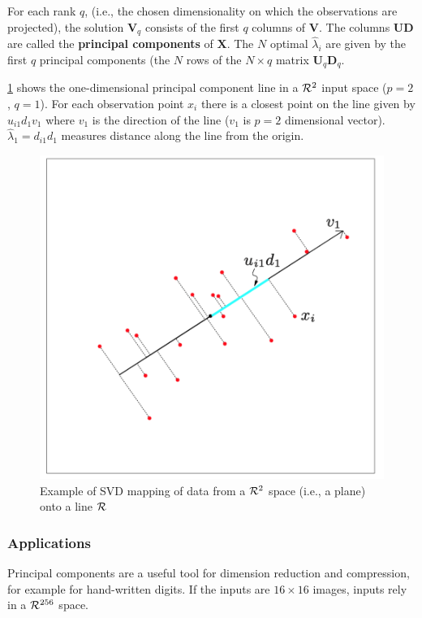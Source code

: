 \documentclass[12pt, letterpaper]{article}
\theoremstyle{definition}
\newcommand{\X}{\mathrm{\mathbf{X}}}
\begin{document}
For each rank $q$, (i.e., the chosen dimensionality on which the observations are projected), the solution $\mathbf{V}_q$  consists of the first $q$ columns of $\mathbf{V}$. The columns $\mathbf{UD}$ are called the \textbf{principal components} of $\X$. The $N$ optimal $\hat{\lambda}_i$ are given by the first $q$ principal components (the $N$ rows of the $N \times q$ matrix $\mathbf{U}_q\mathbf{D}_q$.

\ref{SVDex} shows the one-dimensional principal component line in a $\CMcal{R}^2$ input space ($p=2$, $q=1$). For each observation point $x_i$ there is a closest point on the line given by $u_{i1}d_1v_1$ where $v_1$ is the direction of the line ($v_1$ is $p=2$ dimensional vector). $\hat{\lambda}_1=d_{i1}d_1$ measures distance along the line from the origin.

\begin{figure}
\centering
\includegraphics[scale=0.5]{img/SVD}
\caption{Example of SVD mapping of data from a $\CMcal{R}^2$ space (i.e., a plane) onto a line $\CMcal{R}$}
\label{SVDex}
\end{figure}
\subsubsection{Applications}
Principal components are a useful tool for dimension reduction and compression, for example for hand-written digits. If the inputs are $16\times 16$ images, inputs rely in  a $\CMcal{R}^{256}$ space.
\end{document}
